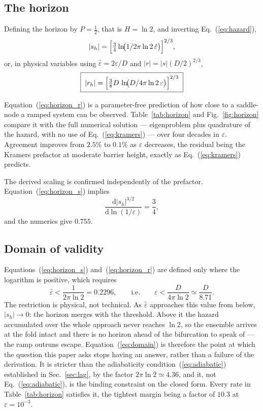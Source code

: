 \documentclass[%
 aip,
 cha,
 amsmath,amssymb,
 reprint,
 superscriptaddress,
 floatfix,
]{revtex4-2}
\newcommand{\dd}{\mathrm{d}}
\newcommand{\Sig}{\hat\varepsilon}
\begin{document}
\subsection{The horizon}

Defining the horizon by $P=\tfrac12$, that is $H=\ln2$, and inverting Eq.~(\ref{eq:hazard}),
\begin{equation}
\label{eq:horizon_s}
|s_h|=\Bigl[\tfrac34\ln\!\bigl(1/2\pi\ln2\,\Sig\bigr)\Bigr]^{2/3},
\end{equation}
or, in physical variables using $\Sig=2\varepsilon/D$ and $|r|=|s|(D/2)^{2/3}$,
\begin{equation}
\label{eq:horizon_r}
\boxed{\;|r_h|=\Bigl[\tfrac38 D\,\ln\!\bigl(D/4\pi\ln2\,\varepsilon\bigr)\Bigr]^{2/3}\;}
\end{equation}

Equation~(\ref{eq:horizon_r}) is a parameter-free prediction of how close to a saddle-node a ramped system can be observed.  Table~\ref{tab:horizon} and Fig.~\ref{fig:horizon} compare it with the full numerical solution --- eigenproblem plus quadrature of the hazard, with no use of Eq.~(\ref{eq:kramers}) --- over four decades in $\varepsilon$.  Agreement improves from $2.5\%$ to $0.1\%$ as $\varepsilon$ decreases, the residual being the Kramers prefactor at moderate barrier height, exactly as Eq.~(\ref{eq:kramers}) predicts.

The derived scaling is confirmed independently of the prefactor.  Equation~(\ref{eq:horizon_s}) implies
\begin{equation}
\label{eq:exponent}
\frac{\dd|s_h|^{3/2}}{\dd\ln(1/\varepsilon)}=\frac34 ,
\end{equation}
and the numerics give $0.755$.

\subsection{\label{sec:domain}Domain of validity}

Equations~(\ref{eq:horizon_s}) and~(\ref{eq:horizon_r}) are defined only where the logarithm is positive, which requires
\begin{equation}
\label{eq:domain}
\Sig<\frac{1}{2\pi\ln2}=0.2296,
\qquad\text{i.e.}\qquad
\varepsilon<\frac{D}{4\pi\ln2}\simeq\frac{D}{8.71}.
\end{equation}
The restriction is physical, not technical.  As $\Sig$ approaches this value from below, $|s_h|\to0$: the horizon merges with the threshold.  Above it the hazard accumulated over the whole approach never reaches $\ln2$, so the ensemble arrives at the fold intact and there is no horizon ahead of the bifurcation to speak of --- the ramp outruns escape.  Equation~(\ref{eq:domain}) is therefore the point at which the question this paper asks stops having an answer, rather than a failure of the derivation.  It is stricter than the adiabaticity condition~(\ref{eq:adiabatic}) established in Sec.~\ref{sec:lag}, by the factor $2\pi\ln2\simeq4.36$, and it, not Eq.~(\ref{eq:adiabatic}), is the binding constraint on the closed form.  Every rate in Table~\ref{tab:horizon} satisfies it, the tightest margin being a factor of $10.3$ at $\varepsilon=10^{-3}$.
\end{document}
